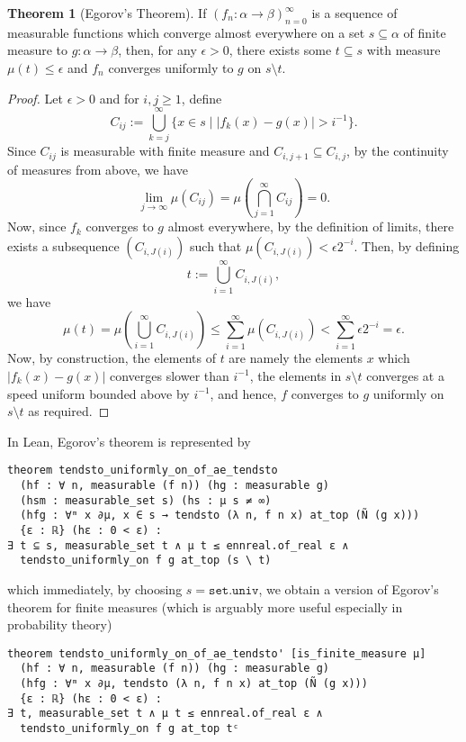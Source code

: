 \documentclass[]{article}
\theoremstyle{definition}
\newtheorem{theorem}{Theorem}
\begin{document}
\begin{theorem}[Egorov's Theorem]
  If \((f_n : \alpha \to \beta)_{n = 0}^\infty\) is a sequence of measurable functions which 
  converge almost everywhere on a set \(s \subseteq \alpha\) of finite measure to 
  \(g : \alpha \to \beta\), then, for any \(\epsilon > 0\), there exists some \(t \subseteq s\) 
  with measure \(\mu(t) \le \epsilon\) and \(f_n\) converges uniformly to \(g\) on 
  \(s \setminus t\). 
\end{theorem}
\begin{proof}
  Let \(\epsilon > 0\) and for \(i, j \ge 1\), define 
  \[C_{ij} := \bigcup_{k = j}^\infty \{x \in s \mid |f_k(x) - g(x)| > i^{-1}\}.\]
  Since \(C_{ij}\) is measurable with finite measure and \(C_{i, j + 1} \subseteq C_{i, j}\), by the 
  continuity of measures from above, we have 
  \[\lim_{j \to \infty} \mu(C_{ij}) = 
    \mu\left(\bigcap_{j = 1}^\infty C_{ij}\right) = 0.\]
  Now, since \(f_k\) converges to \(g\) almost everywhere, by the definition of 
  limits, there exists a subsequence \((C_{i, J(i)})\) such that \(\mu(C_{i, J(i)}) < 
  \epsilon 2^{-i}\). Then, by defining 
  \[t := \bigcup_{i = 1}^\infty C_{i, J(i)},\]
  we have 
  \[\mu(t) = \mu\left(\bigcup_{i = 1}^\infty C_{i, J(i)}\right) \le 
    \sum_{i = 1}^\infty \mu(C_{i, J(i)})
    < \sum_{i = 1}^\infty \epsilon 2^{-i} = \epsilon.\]
  Now, by construction, the elements of \(t\) are namely the elements \(x\) 
  which \(|f_k(x) - g(x)|\) converges slower than \(i^{-1}\), the elements in 
  \(s \setminus t\) converges at a speed uniform bounded above by \(i^{-1}\), and 
  hence, \(f\) converges to \(g\) uniformly on \(s \setminus t\) as required.
\end{proof}

In Lean, Egorov's theorem is represented by 
\begin{verbatim}
theorem tendsto_uniformly_on_of_ae_tendsto
  (hf : ∀ n, measurable (f n)) (hg : measurable g) 
  (hsm : measurable_set s) (hs : μ s ≠ ∞)
  (hfg : ∀ᵐ x ∂μ, x ∈ s → tendsto (λ n, f n x) at_top (Ñ (g x))) 
  {ε : ℝ} (hε : 0 < ε) :
∃ t ⊆ s, measurable_set t ∧ μ t ≤ ennreal.of_real ε ∧ 
  tendsto_uniformly_on f g at_top (s \ t)
\end{verbatim}
which immediately, by choosing \(s = \mathtt{set.univ}\), we obtain a version of Egorov's 
theorem for finite measures (which is arguably more useful especially in probability theory)
\begin{verbatim}
theorem tendsto_uniformly_on_of_ae_tendsto' [is_finite_measure μ]
  (hf : ∀ n, measurable (f n)) (hg : measurable g)
  (hfg : ∀ᵐ x ∂μ, tendsto (λ n, f n x) at_top (Ñ (g x)))
  {ε : ℝ} (hε : 0 < ε) :
∃ t, measurable_set t ∧ μ t ≤ ennreal.of_real ε ∧
  tendsto_uniformly_on f g at_top tᶜ
\end{verbatim}
\end{document}
